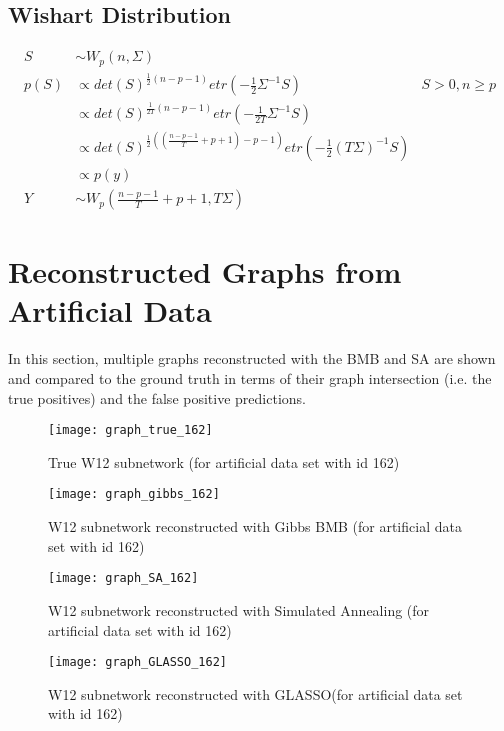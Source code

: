 \subsection{Wishart Distribution}
\begin{align*}
S &\sim W_p(n,\Sigma) \\
p(S) &\propto det(S)^{\frac{1}{2} (n-p-1)} etr\left(-\frac{1}{2} \Sigma^{-1} S\right) & S>0, n\geq p
\\
&\propto  det(S)^{\frac{1}{2T} (n-p-1)} etr\left(-\frac{1}{2T} \Sigma^{-1} S\right)
\\
&\propto  det(S)^{\frac{1}{2} \left( \left(\frac{n-p-1}{T} + p + 1\right) - p - 1\right)  } etr\left(-\frac{1}{2} (T\Sigma)^{-1} S\right)
\\
&\propto p(y)
\\
Y &\sim W_p\left( \frac{n-p-1}{T} + p + 1, T\Sigma\right)
\end{align*}
\pagebreak
\section{Reconstructed Graphs from Artificial Data}
In this section, multiple graphs reconstructed with the BMB and SA are shown and compared to the ground truth in terms of their graph intersection (i.e. the true positives) and the false positive predictions.
\begin{figure}
	\centering
	\texttt{[image: graph\_true\_162]}
	\caption{True W12 subnetwork (for artificial data set with id 162)}
	\label{fig:network_true162}
\end{figure}
\begin{figure}
	\centering
	\texttt{[image: graph\_gibbs\_162]}
	\caption{W12 subnetwork reconstructed with Gibbs BMB (for artificial data set with id 162)}
	\label{fig:network_gibbs162}
\end{figure}
\begin{figure}
	\centering
	\texttt{[image: graph\_SA\_162]}
	\caption{W12 subnetwork reconstructed with Simulated Annealing (for artificial data set with id 162)}
	\label{fig:network_SA162}
\end{figure}
\begin{figure}
	\centering
	\texttt{[image: graph\_GLASSO\_162]}
	\caption{W12 subnetwork reconstructed with GLASSO(for artificial data set with id 162)}
	\label{fig:network_GLASSO162}
\end{figure}




